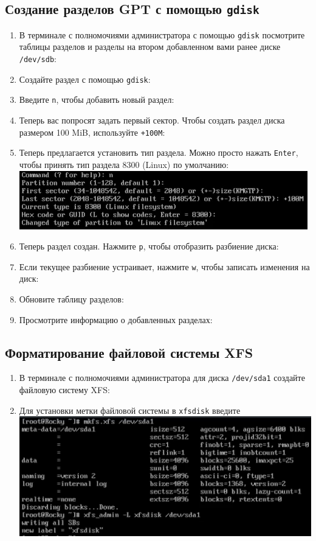 \documentclass[12pt]{article}
\begin{document}
\subsection{Создание разделов GPT с помощью \texttt{gdisk}}
\begin{enumerate}
	\item В терминале с полномочиями администратора с помощью \texttt{gdisk} посмотрите таблицы разделов и разделы на втором добавленном вами ранее диске \texttt{/dev/sdb}:
	\item Создайте раздел с помощью \texttt{gdisk}:
	\item Введите \texttt{n}, чтобы добавить новый раздел:
	\item Теперь вас попросят задать первый сектор. Чтобы создать раздел диска размером 100 MiB, используйте \texttt{+100M}:
	\item Теперь предлагается установить тип раздела. Можно просто нажать \texttt{Enter}, чтобы принять тип раздела 8300 (Linux) по умолчанию:
	      \\\includegraphics{6.png}
	\item Теперь раздел создан. Нажмите \texttt{p}, чтобы отобразить разбиение диска:
	\item Если текущее разбиение устраивает, нажмите \texttt{w}, чтобы записать изменения на диск:
	\item Обновите таблицу разделов:
	\item Просмотрите информацию о добавленных разделах:
\end{enumerate}

\subsection{Форматирование файловой системы XFS}
\begin{enumerate}
	\item В терминале с полномочиями администратора для диска \texttt{/dev/sda1} создайте файловую систему XFS:
	\item Для установки метки файловой системы в \texttt{xfsdisk} введите
	      \\\includegraphics{7.png}
\end{enumerate}
\end{document}
